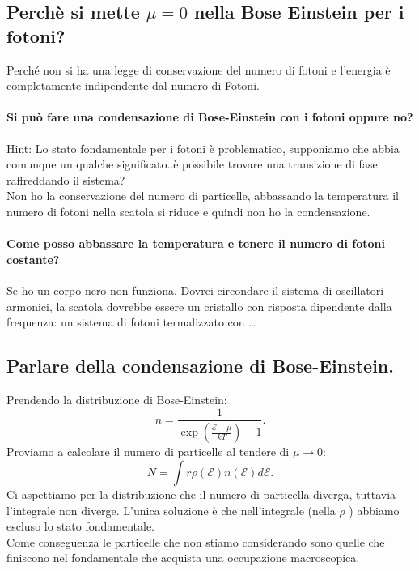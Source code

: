 \subsection{Perchè si mette $\mu =0$ nella Bose Einstein per i fotoni?}%
\label{sub:Perchè si mette mu =0 nella Bose Einstein per i foo}
Perché non si ha una legge di conservazione del numero di fotoni e l'energia è completamente indipendente dal numero di Fotoni.
\paragraph{Si può fare una condensazione di Bose-Einstein con i fotoni oppure no?}%
\label{par:Si può fare una condensazione di Bose-Einstein con i fotoni oppure no?}
Hint: Lo stato fondamentale per i fotoni è problematico, supponiamo che abbia comunque un qualche significato..è possibile trovare una transizione di fase raffreddando il sistema?\\
Non  ho la conservazione del numero di particelle, abbassando la temperatura il numero di fotoni nella scatola si riduce e quindi non ho la condensazione.
\paragraph{Come posso abbassare la temperatura e tenere il numero di fotoni costante?}%
\label{par:Come posso abbassare la temperatura e tenere il numero di fotoni costante?}
Se ho un corpo nero non funziona. Dovrei circondare il sistema di oscillatori armonici, la scatola dovrebbe essere un cristallo con risposta dipendente dalla frequenza: un sistema di fotoni termalizzato con \ldots
\subsection{Parlare della condensazione di Bose-Einstein.}%
\label{sub:Parlare della condensazione di Bose-Einstein.}
Prendendo la distribuzione di Bose-Einstein:
\[
    n = \frac{1}{\exp\left(\frac{\mathcal{E}-\mu}{kT}\right)-1}
.\] 
Proviamo a calcolare il numero di particelle al tendere di $\mu\to 0$:
\[
    N = \int r \rho (\mathcal{E}) n(\mathcal{E}) d\mathcal{E}
.\] 
Ci aspettiamo per la distribuzione che il numero di particella diverga, tuttavia l'integrale non diverge. L'unica soluzione è che nell'integrale (nella $\rho$ ) abbiamo escluso lo stato fondamentale. \\
Come conseguenza le particelle che non stiamo considerando sono quelle che finiscono nel fondamentale che acquista una occupazione macroscopica.
